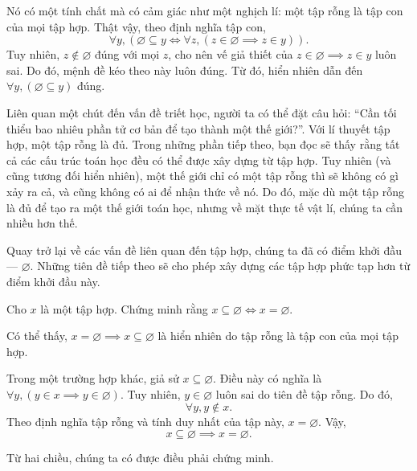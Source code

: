 Nó có một tính chất mà có cảm giác như một nghịch lí: một tập rỗng là tập con của mọi tập hợp. Thật vậy, theo định nghĩa tập con,
$$
\forall y, (\varnothing \subseteq y \iff \forall z, (z \in \varnothing \implies z \in y)).
$$
Tuy nhiên, $z \notin \varnothing$ đúng với mọi $z$, cho nên vế giả thiết của $z \in \varnothing \implies z \in y$ luôn sai. Do đó, mệnh đề kéo theo này luôn đúng. Từ đó, hiển nhiên dẫn đến $\forall y, (\varnothing \subseteq y)$ đúng.

Liên quan một chút đến vấn đề triết học, người ta có thể đặt câu hỏi: ``Cần tối thiểu bao nhiêu phần tử cơ bản để tạo thành một thế giới?''. Với lí thuyết tập hợp, một tập rỗng là đủ. Trong những phần tiếp theo, bạn đọc sẽ thấy rằng tất cả các cấu trúc toán học đều có thể được xây dựng từ tập hợp. Tuy nhiên (và cũng tương đối hiển nhiên), một thế giới chỉ có một tập rỗng thì sẽ không có gì xảy ra cả, và cũng không có ai để nhận thức về nó. Do đó, mặc dù một tập rỗng là đủ để tạo ra một thế giới toán học, nhưng về mặt thực tế vật lí, chúng ta cần nhiều hơn thế.

Quay trở lại về các vấn đề liên quan đến tập hợp, chúng ta đã có điểm khởi đầu --- $\varnothing$. Những tiên đề tiếp theo sẽ cho phép xây dựng các tập hợp phức tạp hơn từ điểm khởi đầu này.

\exercise Cho $x$ là một tập hợp. Chứng minh rằng $x \subseteq \varnothing \iff x = \varnothing$.

\solution

Có thể thấy, $x = \varnothing \implies x \subseteq \varnothing$ là hiển nhiên do tập rỗng là tập con của mọi tập hợp. 

Trong một trường hợp khác, giả sử $x \subseteq \varnothing$. Điều này có nghĩa là $\forall y, (y \in x \implies y \in \varnothing)$. Tuy nhiên, $y \in \varnothing$ luôn sai do tiên đề tập rỗng. Do đó, $$\forall y, y \notin x.$$ Theo định nghĩa tập rỗng và tính duy nhất của tập này, $x = \varnothing$. Vậy,
$$x \subseteq \varnothing \implies x = \varnothing.$$

Từ hai chiều, chúng ta có được điều phải chứng minh.